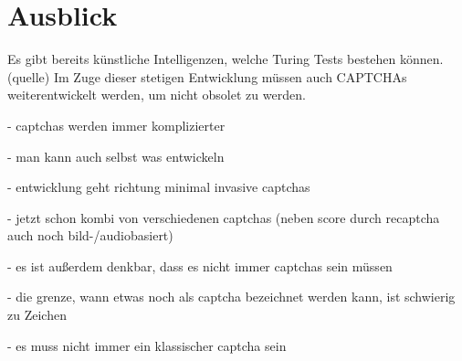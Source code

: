 \chapter{Ausblick}

Es gibt bereits künstliche Intelligenzen, welche Turing Tests bestehen können. (quelle)
Im Zuge dieser stetigen Entwicklung müssen auch CAPTCHAs weiterentwickelt werden,
um nicht obsolet zu werden. 

- captchas werden immer komplizierter

- man kann auch selbst was entwickeln

- entwicklung geht richtung minimal invasive captchas 

- jetzt schon kombi von verschiedenen captchas (neben score durch recaptcha auch noch bild-/audiobasiert)

- es ist außerdem denkbar, dass es nicht immer captchas sein müssen

- die grenze, wann etwas noch als captcha bezeichnet werden kann, ist schwierig zu Zeichen

- es muss nicht immer ein klassischer captcha sein